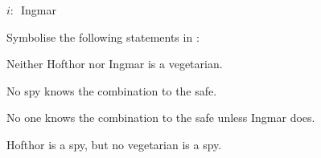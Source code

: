 \documentclass[PHIL101-Textbook.tex]{subfiles}
\begin{document}
	\noindent\hspace{203pt}$i$:$\ \ \ $Ingmar
	\vspace{24pt}
	

\noindent Symbolise the following statements in \pl:
\begin{earg}
\item Neither Hofthor nor Ingmar is a vegetarian.
\item No spy knows the combination to the safe.
\item No one knows the combination to the safe unless Ingmar does.
\item Hofthor is a spy, but no vegetarian is a spy.
\end{earg}
\end{document}
